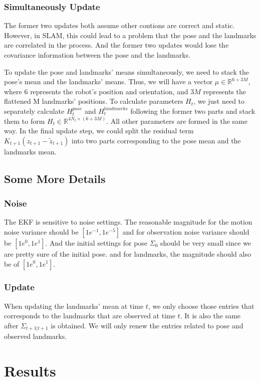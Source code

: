 \documentclass[conference]{IEEEtran}
\begin{document}
\subsubsection{Simultaneously Update}
The former two updates both assume other contions are correct and static. However, in SLAM, this could lead to a problem that 
the pose and the landmarks are correlated in the process. And the former two updates would lose the covariance information
between the pose and the landmarks.

To update the pose and landmarks' means simultaneously, we need to stack the pose's mean and the landmarks' means. Thus, we 
will have a vector $\mu \in \mathbb{R}^{6 + 3M}$, where 6 represents the robot's position and orientation, and $3M$ represents
the flattened M landmarks' positions. To calculate parameters $H_t$, we just need to separately calculate $H_t^{pose}$ and 
$H_t^{landmarks}$ following the former two parts 
and stack them to form $H_t \in \mathbb{R}^{4N_t\times (6+3M)}$. All other parameters are formed in the 
same way. In the final update step, we could split the residual term $K_{t+1}(z_{t+1} - \tilde{z}_{t+1})$ into two parts 
corresponding to the pose mean and the landmarks mean.

\subsection{Some More Details}
\subsubsection{\textbf{Noise}}
The EKF is sensitive to noise settings. The reasonable magnitude for the motion noise variance should be $[1e^{-1}, 1e^{-5}]$
and for observation noise variance should be $[1e^0, 1e^1]$. And the initial settings for pose $\Sigma_0$ should be very small 
since we are pretty sure of the initial pose. and for landmarks, the magnitude should also be of $[1e^0, 1e^1]$.

\subsubsection{\textbf{Update}}
When updating the landmarks' mean at time $t$, we only choose those entries that corresponds to the landmarks that are observed
at time $t$. It is also the same after $\Sigma_{t+1|t+1}$ is obtained. We will only renew the entries related to 
pose and observed landmarks.

\section{Results}
\end{document}
